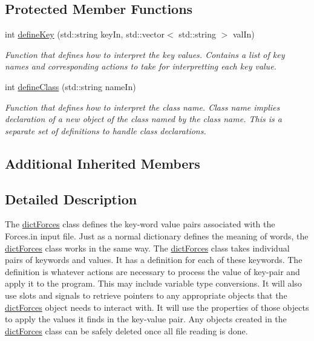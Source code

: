 \subsection*{Protected Member Functions}
\begin{DoxyCompactItemize}
\item 
int \hyperlink{classosea_1_1ofreq_1_1dict_forces_ad2aef64f85e81b8b070ae732d757237e}{define\-Key} (std\-::string key\-In, std\-::vector$<$ std\-::string $>$ val\-In)
\begin{DoxyCompactList}\small\item\em Function that defines how to interpret the key values. Contains a list of key names and corresponding actions to take for interpretting each key value. \end{DoxyCompactList}\item 
int \hyperlink{classosea_1_1ofreq_1_1dict_forces_a4e1fd8cea0c9c689daf6eed864073485}{define\-Class} (std\-::string name\-In)
\begin{DoxyCompactList}\small\item\em Function that defines how to interpret the class name. Class name implies declaration of a new object of the class named by the class name. This is a separate set of definitions to handle class declarations. \end{DoxyCompactList}\end{DoxyCompactItemize}
\subsection*{Additional Inherited Members}


\subsection{Detailed Description}
The \hyperlink{classosea_1_1ofreq_1_1dict_forces}{dict\-Forces} class defines the key-\/word value pairs associated with the Forces.\-in input file. Just as a normal dictionary defines the meaning of words, the \hyperlink{classosea_1_1ofreq_1_1dict_forces}{dict\-Forces} class works in the same way. The \hyperlink{classosea_1_1ofreq_1_1dict_forces}{dict\-Forces} class takes individual pairs of keywords and values. It has a definition for each of these keywords. The definition is whatever actions are necessary to process the value of key-\/pair and apply it to the program. This may include variable type conversions. It will also use slots and signals to retrieve pointers to any appropriate objects that the \hyperlink{classosea_1_1ofreq_1_1dict_forces}{dict\-Forces} object needs to interact with. It will use the properties of those objects to apply the values it finds in the key-\/value pair. Any objects created in the \hyperlink{classosea_1_1ofreq_1_1dict_forces}{dict\-Forces} class can be safely deleted once all file reading is done.

